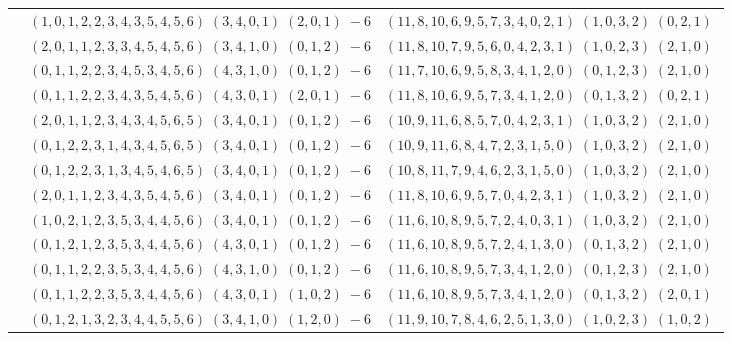 \documentclass[11pt]{article}
\begin{document}
\begin{longtable}[l]{|c|c|c|}
 \cline{2-3} 
 & $(1 ,0 ,1 ,2 ,2 ,3 ,4 ,3 ,5 ,4 ,5 ,6) \;(3 ,4 ,0 ,1) \;(2 ,0 ,1) \;-6$ & $(11 ,8 ,10 ,6 ,9 ,5 ,7 ,3 ,4 ,0 ,2 ,1) \;(1 ,0 ,3 ,2) \;(0 ,2 ,1) \;$\\ 
 \cline{2-3} 
 & $(2 ,0 ,1 ,1 ,2 ,3 ,3 ,4 ,5 ,4 ,5 ,6) \;(3 ,4 ,1 ,0) \;(0 ,1 ,2) \;-6$ & $(11 ,8 ,10 ,7 ,9 ,5 ,6 ,0 ,4 ,2 ,3 ,1) \;(1 ,0 ,2 ,3) \;(2 ,1 ,0) \;$\\ 
 \cline{2-3} 
 & $(0 ,1 ,1 ,2 ,2 ,3 ,4 ,5 ,3 ,4 ,5 ,6) \;(4 ,3 ,1 ,0) \;(0 ,1 ,2) \;-6$ & $(11 ,7 ,10 ,6 ,9 ,5 ,8 ,3 ,4 ,1 ,2 ,0) \;(0 ,1 ,2 ,3) \;(2 ,1 ,0) \;$\\ 
 \cline{2-3} 
 & $(0 ,1 ,1 ,2 ,2 ,3 ,4 ,3 ,5 ,4 ,5 ,6) \;(4 ,3 ,0 ,1) \;(2 ,0 ,1) \;-6$ & $(11 ,8 ,10 ,6 ,9 ,5 ,7 ,3 ,4 ,1 ,2 ,0) \;(0 ,1 ,3 ,2) \;(0 ,2 ,1) \;$\\ 
 \cline{2-3} 
 & $(2 ,0 ,1 ,1 ,2 ,3 ,4 ,3 ,4 ,5 ,6 ,5) \;(3 ,4 ,0 ,1) \;(0 ,1 ,2) \;-6$ & $(10 ,9 ,11 ,6 ,8 ,5 ,7 ,0 ,4 ,2 ,3 ,1) \;(1 ,0 ,3 ,2) \;(2 ,1 ,0) \;$\\ 
 \cline{2-3} 
 & $(0 ,1 ,2 ,2 ,3 ,1 ,4 ,3 ,4 ,5 ,6 ,5) \;(3 ,4 ,0 ,1) \;(0 ,1 ,2) \;-6$ & $(10 ,9 ,11 ,6 ,8 ,4 ,7 ,2 ,3 ,1 ,5 ,0) \;(1 ,0 ,3 ,2) \;(2 ,1 ,0) \;$\\ 
 \cline{2-3} 
 & $(0 ,1 ,2 ,2 ,3 ,1 ,3 ,4 ,5 ,4 ,6 ,5) \;(3 ,4 ,0 ,1) \;(0 ,1 ,2) \;-6$ & $(10 ,8 ,11 ,7 ,9 ,4 ,6 ,2 ,3 ,1 ,5 ,0) \;(1 ,0 ,3 ,2) \;(2 ,1 ,0) \;$\\ 
 \cline{2-3} 
 & $(2 ,0 ,1 ,1 ,2 ,3 ,4 ,3 ,5 ,4 ,5 ,6) \;(3 ,4 ,0 ,1) \;(0 ,1 ,2) \;-6$ & $(11 ,8 ,10 ,6 ,9 ,5 ,7 ,0 ,4 ,2 ,3 ,1) \;(1 ,0 ,3 ,2) \;(2 ,1 ,0) \;$\\ 
 \cline{2-3} 
 & $(1 ,0 ,2 ,1 ,2 ,3 ,5 ,3 ,4 ,4 ,5 ,6) \;(3 ,4 ,0 ,1) \;(0 ,1 ,2) \;-6$ & $(11 ,6 ,10 ,8 ,9 ,5 ,7 ,2 ,4 ,0 ,3 ,1) \;(1 ,0 ,3 ,2) \;(2 ,1 ,0) \;$\\ 
 \cline{2-3} 
 & $(0 ,1 ,2 ,1 ,2 ,3 ,5 ,3 ,4 ,4 ,5 ,6) \;(4 ,3 ,0 ,1) \;(0 ,1 ,2) \;-6$ & $(11 ,6 ,10 ,8 ,9 ,5 ,7 ,2 ,4 ,1 ,3 ,0) \;(0 ,1 ,3 ,2) \;(2 ,1 ,0) \;$\\ 
 \cline{2-3} 
 & $(0 ,1 ,1 ,2 ,2 ,3 ,5 ,3 ,4 ,4 ,5 ,6) \;(4 ,3 ,1 ,0) \;(0 ,1 ,2) \;-6$ & $(11 ,6 ,10 ,8 ,9 ,5 ,7 ,3 ,4 ,1 ,2 ,0) \;(0 ,1 ,2 ,3) \;(2 ,1 ,0) \;$\\ 
 \cline{2-3} 
 & $(0 ,1 ,1 ,2 ,2 ,3 ,5 ,3 ,4 ,4 ,5 ,6) \;(4 ,3 ,0 ,1) \;(1 ,0 ,2) \;-6$ & $(11 ,6 ,10 ,8 ,9 ,5 ,7 ,3 ,4 ,1 ,2 ,0) \;(0 ,1 ,3 ,2) \;(2 ,0 ,1) \;$\\ 
 \cline{2-3} 
 & $(0 ,1 ,2 ,1 ,3 ,2 ,3 ,4 ,4 ,5 ,5 ,6) \;(3 ,4 ,1 ,0) \;(1 ,2 ,0) \;-6$ & $(11 ,9 ,10 ,7 ,8 ,4 ,6 ,2 ,5 ,1 ,3 ,0) \;(1 ,0 ,2 ,3) \;(1 ,0 ,2) \;$\\ 

\end{longtable}
\end{document}
